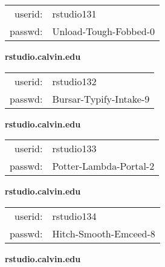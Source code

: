 \documentclass{article}\usepackage[]{graphicx}\usepackage[]{color}
\begin{document}
\begin{multicols}{3}
\begin{minipage}{.3\textwidth}
\begin{tabular}{rl}
userid: & rstudio131\\
passwd: & Unload-Tough-Fobbed-0

\vspace{5mm}

\end{tabular}\end{minipage}

\vspace{5mm}

\begin{minipage}{.3\textwidth}
\centerline{\textbf{rstudio.calvin.edu}}
\medskip
\begin{tabular}{rl}

userid: & rstudio132\\
passwd: & Bursar-Typify-Intake-9

\vspace{5mm}

\end{tabular}\end{minipage}

\vspace{5mm}

\begin{minipage}{.3\textwidth}
\centerline{\textbf{rstudio.calvin.edu}}
\medskip
\begin{tabular}{rl}

userid: & rstudio133\\
passwd: & Potter-Lambda-Portal-2

\vspace{5mm}

\end{tabular}\end{minipage}

\vspace{5mm}

\begin{minipage}{.3\textwidth}
\centerline{\textbf{rstudio.calvin.edu}}
\medskip
\begin{tabular}{rl}

userid: & rstudio134\\
passwd: & Hitch-Smooth-Emceed-8

\vspace{5mm}

\end{tabular}\end{minipage}

\vspace{5mm}

\begin{minipage}{.3\textwidth}
\centerline{\textbf{rstudio.calvin.edu}}
\medskip
\begin{tabular}{rl}


\end{tabular}
\end{minipage}
\end{multicols}
\end{document}
